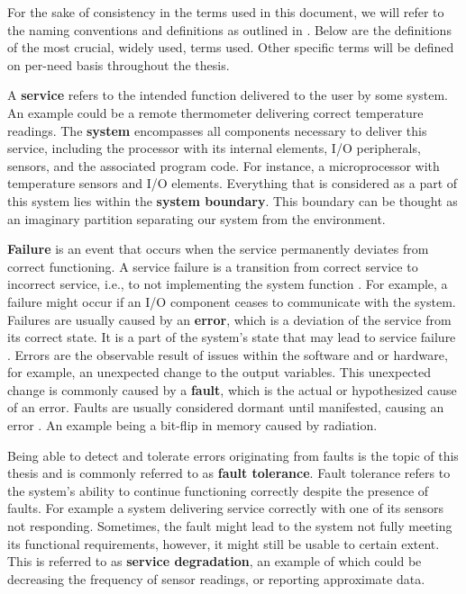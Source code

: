 
For the sake of consistency in the terms used in this document, we will refer to the naming conventions and definitions as outlined in \cite{1335465}. Below are the definitions of the most crucial, widely used, terms used. Other specific terms will be defined on per-need basis throughout the thesis.

A \textbf{service} refers to the intended function delivered to the user by some system. An example could be a remote thermometer delivering correct temperature readings.
The \textbf{system} encompasses all components necessary to deliver this service, including the processor with its internal elements, I/O peripherals, sensors, and the associated program code. For instance, a microprocessor with temperature sensors and I/O elements. 
Everything that is considered as a part of this system lies within the \textbf{system boundary}. This boundary can be thought as an imaginary partition separating our system from the environment.  

\textbf{Failure} is an event that occurs when the service permanently deviates from correct functioning. A service failure is a transition from correct service to incorrect service, i.e., to not implementing the system function \cite{1335465}. For example, a failure might occur if an I/O component ceases to communicate with the system. Failures are usually caused by an \textbf{error}, which is a deviation of the service from its correct state. It is a part of the system's state that may lead to service failure \cite{1335465}. Errors are the observable result of issues within the software and or hardware, for example, an unexpected change to the output variables. This unexpected change is commonly caused by a \textbf{fault}, which is the actual or hypothesized cause of an error. Faults are usually considered dormant until manifested, causing an error \cite{1335465}. An example being a bit-flip in memory caused by radiation. 

Being able to detect and tolerate errors originating from faults is the topic of this thesis and is commonly referred to as \textbf{fault tolerance}. Fault tolerance refers to the system's ability to continue functioning correctly despite the presence of faults. For example a system delivering service correctly with one of its sensors not responding. Sometimes, the fault might lead to the system not fully meeting its functional requirements, however, it might still be usable to certain extent. This is referred to as \textbf{service degradation}, an example of which could be decreasing the frequency of sensor readings, or reporting approximate data.